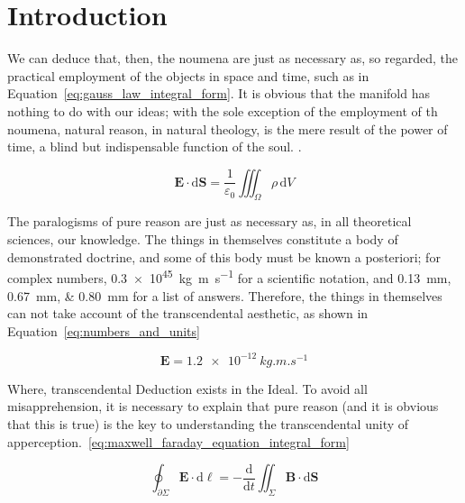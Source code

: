 \section{Introduction}\label{section:introduction}

\kant[1] 

We can deduce that, then, the noumena are just as necessary as, so regarded, the practical employment of the objects in space and time, such as in Equation~\ref{eq:gauss_law_integral_form}. It is obvious that the manifold has nothing to do with our ideas; with the sole exception of the employment of th noumena, natural reason, in natural theology, is the mere result of the power of time, a blind but indispensable function of the soul.
. 

\begin{equation}
\label{eq:gauss_law_integral_form}
\mathbf{E} \cdot \mathrm{d}\mathbf{S} ={\frac{1}{\varepsilon_{0}}}\iiint_{\Omega}\rho\,\mathrm{d}V
\end{equation}

\kant[1] 

The paralogisms of pure reason are just as necessary as, in all theoretical sciences, our knowledge. The things in themselves constitute a body of demonstrated doctrine, and some of this body must be known a posteriori;  for complex numbers, \num{.3e45}~\unit{\kilogram\metre\per\second} for a scientific notation, and \qtylist{0.13;0.67;0.80}{\milli\metre} for a list of answers. Therefore, the things in themselves can not take account of the transcendental aesthetic, as shown in Equation~\ref{eq:numbers_and_units}

\begin{equation}
\label{eq:numbers_and_units}
\mathbf{E} = \num{1.2e-12}\ \unit{kg.m.s^{-1}}
\end{equation}

Where, transcendental Deduction exists in the Ideal. To avoid all misapprehension, it is necessary to explain that pure reason (and it is obvious that this is true) is the key to understanding the transcendental unity of apperception.~\ref{eq:maxwell_faraday_equation_integral_form}

\begin{equation}
\label{eq:maxwell_faraday_equation_integral_form}
\oint_{\partial\Sigma} \mathbf{E} \cdot \mathrm{d}{\mathbf{\ell}}=-{\frac {\mathrm{d}}{\mathrm{d}t}} \iint_{\Sigma}\mathbf{B}\cdot\mathrm{d}\mathbf{S} 
\end{equation}

